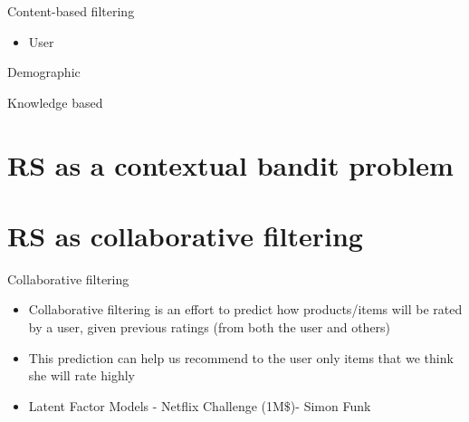 \documentclass[obeyspaces]{beamer}
\providecommand{\tightlist}{%
  \setlength{\itemsep}{0pt}\setlength{\parskip}{0pt}}
\begin{document}
\begin{frame}{Content-based filtering}

\begin{itemize}
\tightlist
\item
  User
\end{itemize}

\end{frame}

\begin{frame}{Demographic}

\end{frame}

\begin{frame}{}

\end{frame}

\begin{frame}{Knowledge based}

\end{frame}

\section{RS as a contextual bandit
problem}\label{rs-as-a-contextual-bandit-problem}

\section{RS as collaborative
filtering}\label{rs-as-collaborative-filtering}

\begin{frame}{Collaborative filtering}

\begin{itemize}
\tightlist
\item
  Collaborative filtering is an effort to predict how products/items
  will be rated by a user, given previous ratings (from both the user
  and others)
\item
  This prediction can help us recommend to the user only items that we
  think she will rate highly
\item
  Latent Factor Models - Netflix Challenge (1M\(\$\))- Simon Funk
\end{itemize}

\end{frame}
\end{document}

